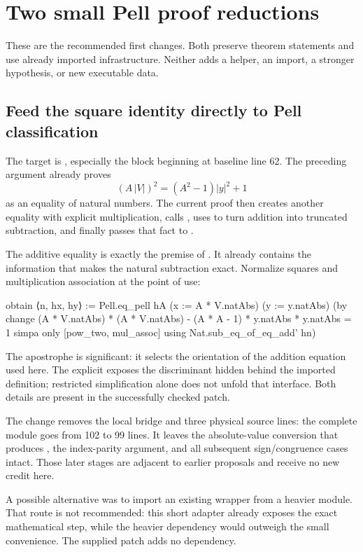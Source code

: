 \section{Two small Pell proof reductions}
\label{sec:pell}
These are the recommended first changes. Both preserve theorem statements and use already imported infrastructure. Neither adds a helper, an import, a stronger hypothesis, or new executable data.

\subsection{Feed the square identity directly to Pell classification}
The target is , especially the block beginning at baseline line 62. The preceding argument already proves
\[
 (A\,|V|)^2=(A^2-1)|y|^2+1
\]
as an equality of natural numbers. The current proof then creates another equality with explicit multiplication, calls , uses  to turn addition into truncated subtraction, and finally passes that fact to .

The additive equality is exactly the premise of . It already contains the information that makes the natural subtraction exact. Normalize squares and multiplication association at the point of use:
\begin{lean}
obtain ⟨n, hx, hy⟩ := Pell.eq_pell hA
    (x := A * V.natAbs) (y := y.natAbs) (by
  change (A * V.natAbs) * (A * V.natAbs) -
    (A * A - 1) * y.natAbs * y.natAbs = 1
  simpa only [pow_two, mul_assoc] using
    Nat.sub_eq_of_eq_add' hn)
\end{lean}

The apostrophe is significant: it selects the orientation of the addition equation used here. The explicit  exposes the discriminant hidden behind the imported  definition; restricted simplification alone does not unfold that interface. Both details are present in the successfully checked patch.

The change removes the local  bridge and three physical source lines: the complete module goes from 102 to 99 lines. It leaves the absolute-value conversion that produces , the index-parity argument, and all subsequent sign/congruence cases intact. Those later stages are adjacent to earlier proposals and receive no new credit here.

A possible alternative was to import an existing  wrapper from a heavier module. That route is not recommended: this short adapter already exposes the exact mathematical step, while the heavier dependency would outweigh the small convenience. The supplied patch adds no dependency.

